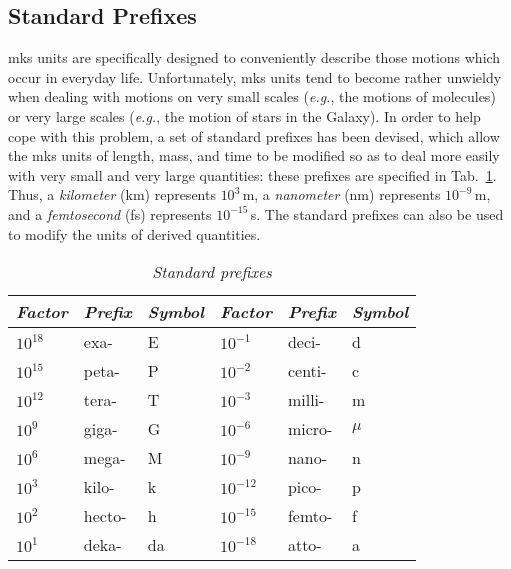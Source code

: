\subsection{Standard Prefixes}
mks units are specifically designed to conveniently describe those motions which occur in everyday life.
Unfortunately, mks units tend to become rather unwieldy when dealing with motions on very
small scales ({\em e.g.}, the motions of molecules) or very large scales ({\em e.g.}, the
motion of stars in the Galaxy). In order to help cope with this problem, a set
of standard prefixes has been devised, which allow the mks units of length, mass, and time
to be modified so as to deal more
easily with very small and very large quantities: 
these prefixes are specified in Tab.~\ref{t1}. Thus, a {\em kilometer} (km) represents $10^3$\,m, 
a {\em nanometer}  (nm) represents
$10^{-9}$\,m, and a {\em femtosecond} (fs) represents $10^{-15}$\,s. The standard prefixes
can also be used to modify the units of derived quantities. 

\begin{table}
\centering
\begin{tabular}{lll|lll}\hline\hline
{\em Factor} & {\em Prefix} & {\em Symbol} & {\em Factor} & {\em Prefix} & {\em Symbol} \\
\hline
$10^{18}$ & exa- & E & $10^{-1}$ & deci- & d\\
$10^{15}$ & peta- & P & $10^{-2}$ & centi- & c\\
$10^{12}$ & tera- & T & $10^{-3}$ & milli- & m\\
$10^{9}$ & giga- & G & $10^{-6}$ & micro- & $\mu$\\
$10^{6}$ & mega- & M & $10^{-9}$ & nano- & n\\
$10^{3}$ & kilo- & k & $10^{-12}$ & pico- & p\\
$10^{2}$ & hecto- & h & $10^{-15}$ & femto- & f\\
$10^{1}$ & deka- & da & $10^{-18}$ & atto- & a\\
\hline\hline
\end{tabular}
\caption{\em Standard prefixes}\label{t1}
\end{table}

